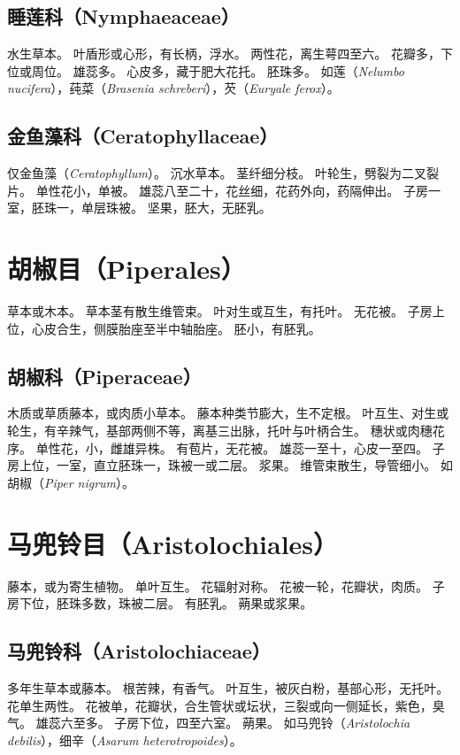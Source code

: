 \documentclass[11pt]{article}
\begin{document}
\begin{sloppypar}
\subsection{睡莲科（Nymphaeaceae）}
水生草本。
叶盾形或心形，有长柄，浮水。
两性花，离生萼四至六。
花瓣多，下位或周位。
雄蕊多。
心皮多，藏于肥大花托。
胚珠多。
如莲（\textit{Nelumbo nucifera}），莼菜（\textit{Brasenia schreberi}），芡（\textit{Euryale ferox}）。

\subsection{金鱼藻科（Ceratophyllaceae）}
仅金鱼藻（\textit{Ceratophyllum}）。
沉水草本。
茎纤细分枝。
叶轮生，劈裂为二叉裂片。
单性花小，单被。
雄蕊八至二十，花丝细，花药外向，药隔伸出。
子房一室，胚珠一，单层珠被。
坚果，胚大，无胚乳。

\section{胡椒目（Piperales）}
草本或木本。
草本茎有散生维管束。
叶对生或互生，有托叶。
无花被。
子房上位，心皮合生，侧膜胎座至半中轴胎座。
胚小，有胚乳。

\subsection{胡椒科（Piperaceae）}
木质或草质藤本，或肉质小草本。
藤本种类节膨大，生不定根。
叶互生、对生或轮生，有辛辣气，基部两侧不等，离基三出脉，托叶与叶柄合生。
穗状或肉穗花序。
单性花，小，雌雄异株。
有苞片，无花被。
雄蕊一至十，心皮一至四。
子房上位，一室，直立胚珠一，珠被一或二层。
浆果。
维管束散生，导管细小。
如胡椒（\textit{Piper nigrum}）。

\section{马兜铃目（Aristolochiales）}
藤本，或为寄生植物。
单叶互生。
花辐射对称。
花被一轮，花瓣状，肉质。
子房下位，胚珠多数，珠被二层。
有胚乳。
蒴果或浆果。

\subsection{马兜铃科（Aristolochiaceae）}
多年生草本或藤本。
根苦辣，有香气。
叶互生，被灰白粉，基部心形，无托叶。
花单生两性。
花被单，花瓣状，合生管状或坛状，三裂或向一侧延长，紫色，臭气。
雄蕊六至多。
子房下位，四至六室。
蒴果。
如马兜铃（\textit{Aristolochia debilis}），细辛（\textit{Asarum heterotropoides}）。


\end{sloppypar}
\end{document}
